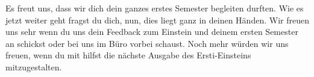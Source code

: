 Es freut uns, dass wir dich dein ganzes erstes Semester begleiten durften. Wie es jetzt weiter geht fragst du dich, nun, dies liegt ganz in deinen Händen. Wir freuen uns sehr wenn du uns dein Feedback zum Einstein und deinem ersten Semester an  schickst oder bei uns im Büro vorbei schaust. Noch mehr würden wir uns freuen, wenn du mit hilfst die nächste Ausgabe des Ersti-Einsteins mitzugestalten.